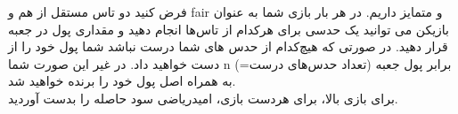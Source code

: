 فرض کنید دو تاس مستقل از هم و fair و متمایز داریم. در هر بار بازی شما به عنوان بازیکن می توانید یک حدسی برای هرکدام از تاس‌ها انجام دهید و مقداری پول در جعبه قرار دهید. در صورتی که هیچ‌کدام از حدس های شما درست نباشد شما پول خود را از دست خواهید داد. در غیر این صورت شما n (=تعداد حدس‌های درست) برابر پول جعبه به همراه اصل پول خود را برنده خواهید شد.\\
برای بازی بالا،‌ برای هردست بازی،‌ امیدریاضی سود حاصله را بدست آوردید.
